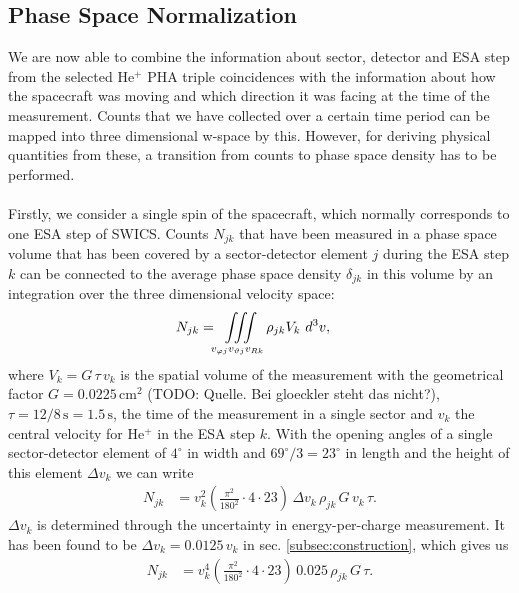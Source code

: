 \subsection{Phase Space Normalization}
We are now able to combine the information about sector, detector and ESA step from the selected $\mathrm{He^{+}}$ PHA triple coincidences with the information about how the spacecraft was moving and which direction it was facing at the time of the measurement.
Counts that we have collected over a certain time period can be mapped into three dimensional w-space by this. However, for deriving physical quantities from these, a transition from counts to phase space density has to be performed.\\ \\
Firstly, we consider a single spin of the spacecraft, which normally corresponds to one ESA step of SWICS.
Counts $N_{jk}$ that have been measured in a phase space volume that has been covered by a sector-detector element $j$ during the ESA step $k$ can be connected to the average phase space density $\delta_{jk}$ in this volume by an integration over the three dimensional velocity space:
\begin{align*}
N_{jk} &= \iiint\displaylimits_{v_{\varphi j}v_{\vartheta j}v_{R k}} \rho_{jk}	V_k	\,\,	d^3v,
\end{align*}
where $V_k = G \, \tau \, v_k$ is the spatial volume of the measurement with the geometrical factor $G = 0.0225 \,\mathrm{cm^2}$ (TODO: Quelle. Bei gloeckler steht das nicht?), $\tau = 12/8\,\mathrm{s} = 1.5\,\mathrm{s}$, the time of the measurement in a single sector and $v_k$ the central velocity for $\mathrm{He^{+}}$ in the ESA step $k$.
With the opening angles of a single sector-detector element of $4^\circ$ in width and $69^\circ /3 = 23^\circ$ in length and the height of this element $\Delta v_k$ we can write
\begin{align*}
N_{jk} &= v^2_k \left(\frac{\pi^2}{180^2}\cdot4 \cdot 23\right) \, \Delta v_k \, \rho_{jk} \,	G \, v_k \, \tau.
\end{align*}
$\Delta v_k$ is determined through the uncertainty in energy-per-charge measurement. It has been found to be $\Delta v_k = 0.0125 \, v_k$ in sec. \ref{subsec:construction}, which gives us
\begin{align*}
N_{jk} &= v^4_k \left(\frac{\pi^2}{180^2}\cdot4 \cdot 23\right) \, 0.025\, \rho_{jk} \, G  \, \tau.
\end{align*}
